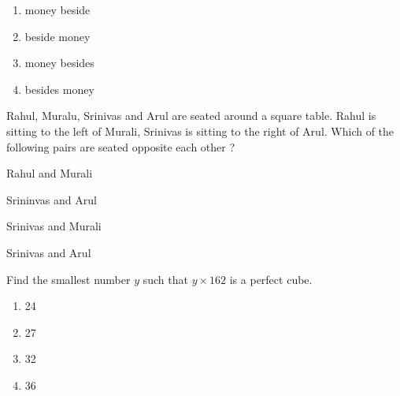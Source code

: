         \begin{multicols}{4}
            \begin{enumerate}
                \item money beside
                    \columnbreak
                \item beside money
                    \columnbreak
                \item money besides
                    \columnbreak
                \item besides money
            \end{enumerate}
        \end{multicols}

    \item Rahul, Muralu, Srinivas and Arul are seated around a square table. Rahul is sitting
        to the left of Murali, Srinivas is sitting to the right of Arul. Which of the following
        pairs are seated opposite each other ?
        \hfill{}
        \begin{enumerate}
                \begin{multicols}{2}
                \item Rahul and Murali
                    \columnbreak
                \item Srininvas and Arul
                \end{multicols}
                \begin{multicols}{2}
                \item Srinivas and Murali
                    \columnbreak
                \item Srinivas and Arul
                \end{multicols}
        \end{enumerate}

    \item Find the smallest number $y$ such that $y \times 162$ is a perfect cube.
        \hfill{}
        \begin{multicols}{4}
            \begin{enumerate}
                \item  24
                    \columnbreak
                \item 27
                    \columnbreak
                \item 32
                    \columnbreak
                \item 36
            \end{enumerate}
        \end{multicols}


